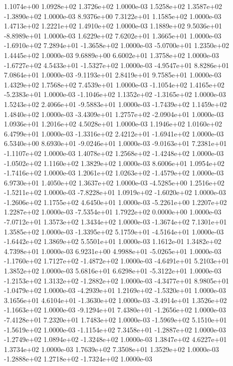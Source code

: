 1.1074e+00 1.0928e+02 1.3726e+02  1.0000e-03
 1.5258e+02  1.3587e+02 -1.3890e+02  1.0000e-03
8.9376e+00 7.3122e+01 1.1585e+02  1.0000e-03
1.4713e+02 1.2221e+02 1.4910e+02  1.0000e-03
 1.1889e+02  9.5036e+01 -8.8989e+01  1.0000e-03
1.6229e+02 7.6202e+01 1.3665e+01  1.0000e-03
-1.6910e+02  7.2894e+01 -1.3658e+02  1.0000e-03
-5.0700e+01  1.2350e+02  1.4445e+02  1.0000e-03
9.6889e+00 6.6002e+01 1.3758e+02  1.0000e-03
-1.6727e+02  4.5433e+01 -1.5327e+02  1.0000e-03
-4.9547e+01  8.8286e+01  7.0864e+01  1.0000e-03
-9.1193e+01  2.8419e+01  9.7585e+01  1.0000e-03
1.4329e+02 1.7568e+02 7.4539e+01  1.0000e-03
-1.1054e+02  1.4165e+02 -5.2383e+01  1.0000e-03
-1.1046e+02  1.1352e+02 -1.3165e+02  1.0000e-03
 1.5243e+02  2.4066e+01 -9.5883e+01  1.0000e-03
-1.7439e+02  1.1459e+02  1.4840e+02  1.0000e-03
-3.4309e+01  1.2757e+02 -2.0904e+01  1.0000e-03
1.0936e+01 1.2016e+02 4.5028e+01  1.0000e-03
1.1946e+02 1.0160e+02 6.4799e+01  1.0000e-03
-1.3316e+02  2.4212e+01 -1.6941e+02  1.0000e-03
 6.5340e+00  8.6930e+01 -9.0246e+01  1.0000e-03
-9.0163e+01  7.2381e+01 -1.1107e+02  1.0000e-03
 1.4078e+02  1.2568e+02 -1.4248e+02  1.0000e-03
-1.0502e+02  1.1160e+02  1.3829e+02  1.0000e-03
 8.6006e+01  1.0954e+02 -1.7416e+02  1.0000e-03
 1.2061e+02  1.0263e+02 -1.4579e+02  1.0000e-03
6.9730e+01 1.4050e+02 1.3637e+02  1.0000e-03
-4.5285e+00  1.2516e+02 -1.5211e+02  1.0000e-03
-7.8228e+01  1.0919e+02 -1.6020e+02  1.0000e-03
-1.2606e+02  1.1755e+02  4.6450e+01  1.0000e-03
-5.2261e+00  1.2207e+02  1.2287e+02  1.0000e-03
-7.5354e+01  1.7922e+02  0.0000e+00  1.0000e-03
-7.0712e+01  1.3573e+02  1.3434e+02  1.0000e-03
-1.3674e+02  7.1301e+01  1.3585e+02  1.0000e-03
-1.3395e+02  5.1759e+01 -4.5164e+01  1.0000e-03
-1.6442e+02  1.3869e+02  5.5501e+01  1.0000e-03
1.1612e-01 1.3482e+02 4.7398e+01  1.0000e-03
 6.9231e+00  4.9988e+01 -5.0265e+01  1.0000e-03
-1.1760e+02  1.7127e+02 -1.4872e+02  1.0000e-03
-4.6491e+01  5.2103e+01  1.3852e+02  1.0000e-03
 5.6816e+01  6.6298e+01 -5.3122e+01  1.0000e-03
-1.2153e+02  1.3132e+02 -1.2882e+02  1.0000e-03
-4.3477e+01  8.9805e+01 -1.0479e+02  1.0000e-03
-4.2939e+01  1.2169e+02 -1.5320e+01  1.0000e-03
 3.1656e+01  4.6104e+01 -1.3630e+02  1.0000e-03
-3.4914e+01  1.3526e+02 -1.1663e+02  1.0000e-03
-9.1294e+01  7.4380e+01 -1.2656e+02  1.0000e-03
-7.4128e+01  7.2320e+01  1.7483e+02  1.0000e-03
-1.5969e+02  5.1510e+01 -1.5619e+02  1.0000e-03
-1.1154e+02  7.3458e+01 -1.2887e+02  1.0000e-03
-1.2749e+02  1.0894e+02 -1.3248e+02  1.0000e-03
1.3847e+02 4.6227e+01 1.3734e+02  1.0000e-03
1.7639e+02 7.3508e+01 1.3529e+02  1.0000e-03
-1.2888e+02  1.2718e+02 -1.7324e+02  1.0000e-03
